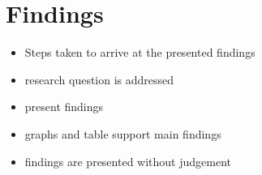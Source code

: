 \chapter{Findings}
\label{cha:findings}

\begin{itemize}
    \item Steps taken to arrive at the presented findings 
    \item research question is addressed
    \item present findings
    \item graphs and table support main findings 
    \item findings are presented without judgement
\end{itemize}
